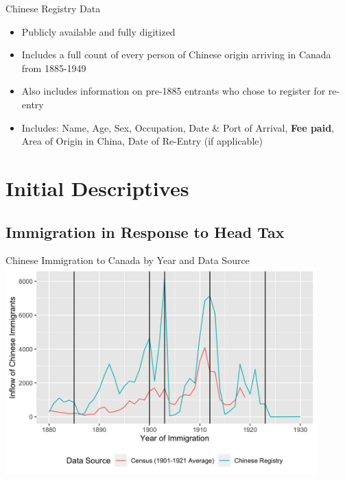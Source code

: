\documentclass[pdf]{beamer}
\begin{document}
\begin{frame}{Chinese Registry Data}
    \begin{itemize}
        \item Publicly available and fully digitized
        \item Includes a full count of every person of Chinese origin arriving in Canada from 1885-1949
        \item Also includes information on pre-1885 entrants who chose to register for re-entry 
        \item Includes: Name, Age, Sex, Occupation, Date \& Port of Arrival, \textbf{Fee paid}, Area of Origin in China, Date of Re-Entry (if applicable) 
    \end{itemize}
\end{frame}

\section{Initial Descriptives}
\subsection{Immigration in Response to Head Tax}
\begin{frame}[label = yrimmchi]{Chinese Immigration to Canada by Year and Data Source}
    \centering
    \includegraphics[width = 0.9\textwidth]{../../figs/yrimmchi.png}
    \hyperlink{dateimmchi}{}
\end{frame}
\end{document}
